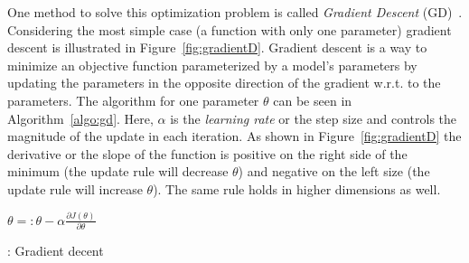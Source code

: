 \noindent
One method to solve this optimization problem is called \emph{Gradient Descent} (GD)~. Considering the most simple case (a function with only one parameter) gradient descent is illustrated in Figure~\ref{fig:gradientD}. Gradient descent is a way to minimize an objective function parameterized by a model’s parameters by updating the parameters in the opposite direction of the gradient w.r.t. to the parameters.
The algorithm for one parameter $\theta$ can be seen in Algorithm~\ref{algo:gd}. Here, $\alpha$ is the \emph{learning rate} or the step size and controls the magnitude of the update in each iteration.
As shown in Figure~\ref{fig:gradientD} the derivative or the slope of the function is positive on the right side of the minimum (the update rule will decrease $\theta$) and negative on the left size (the update rule will increase $\theta$). The same rule holds in higher dimensions as well. \\

\begin{algorithm}[htbp]
  \begin{algorithmic}[1]
    \newcommand{\UF}{\mathrm{U}}
 \State $\theta=: \theta- \alpha\frac { \partial J(\theta) }{ \partial \theta } $
  \EndWhile
  \end{algorithmic}
\caption{: Gradient decent}
 \label{algo:gd}
\end{algorithm}

